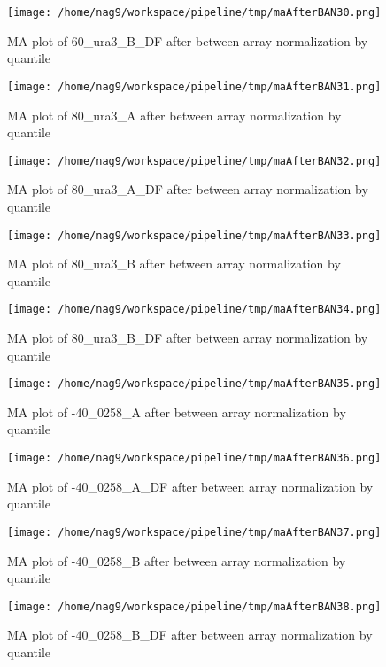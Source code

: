\documentclass[titlepage]{article}
\begin{document}
\begin{figure}[htb!]
\centering
\texttt{[image: /home/nag9/workspace/pipeline/tmp/maAfterBAN30.png]}
\caption{MA plot of 60\_ura3\_B\_DF after between array normalization by quantile}
\end{figure}\pagebreak
\begin{figure}[htb!]
\centering
\texttt{[image: /home/nag9/workspace/pipeline/tmp/maAfterBAN31.png]}
\caption{MA plot of 80\_ura3\_A after between array normalization by quantile}
\end{figure}\pagebreak
\begin{figure}[htb!]
\centering
\texttt{[image: /home/nag9/workspace/pipeline/tmp/maAfterBAN32.png]}
\caption{MA plot of 80\_ura3\_A\_DF after between array normalization by quantile}
\end{figure}\pagebreak
\begin{figure}[htb!]
\centering
\texttt{[image: /home/nag9/workspace/pipeline/tmp/maAfterBAN33.png]}
\caption{MA plot of 80\_ura3\_B after between array normalization by quantile}
\end{figure}\pagebreak
\begin{figure}[htb!]
\centering
\texttt{[image: /home/nag9/workspace/pipeline/tmp/maAfterBAN34.png]}
\caption{MA plot of 80\_ura3\_B\_DF after between array normalization by quantile}
\end{figure}\pagebreak
\begin{figure}[htb!]
\centering
\texttt{[image: /home/nag9/workspace/pipeline/tmp/maAfterBAN35.png]}
\caption{MA plot of -40\_0258\_A after between array normalization by quantile}
\end{figure}\pagebreak
\begin{figure}[htb!]
\centering
\texttt{[image: /home/nag9/workspace/pipeline/tmp/maAfterBAN36.png]}
\caption{MA plot of -40\_0258\_A\_DF after between array normalization by quantile}
\end{figure}\pagebreak
\begin{figure}[htb!]
\centering
\texttt{[image: /home/nag9/workspace/pipeline/tmp/maAfterBAN37.png]}
\caption{MA plot of -40\_0258\_B after between array normalization by quantile}
\end{figure}\pagebreak
\begin{figure}[htb!]
\centering
\texttt{[image: /home/nag9/workspace/pipeline/tmp/maAfterBAN38.png]}
\caption{MA plot of -40\_0258\_B\_DF after between array normalization by quantile}
\end{figure}\pagebreak
\end{document}

